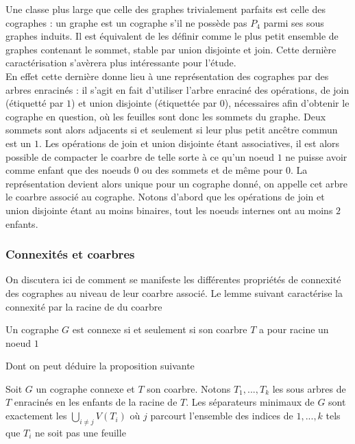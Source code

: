 \documentclass{scrartcl}
\begin{document}
\begin{flushleft}
Une classe plus large que celle des graphes trivialement parfaits est celle des cographes : un graphe est un cographe s'il ne possède pas
$P_4$ parmi ses sous graphes induits. Il est équivalent de les définir comme le plus petit ensemble de graphes contenant le sommet, stable par
union disjointe et join. Cette dernière caractérisation s'avèrera plus intéressante pour l'étude.\\
En effet cette dernière donne lieu à une représentation des cographes par des arbres enracinés : il s'agit en fait d'utiliser l'arbre
enraciné des opérations, de join (étiquetté par $1$) et union disjointe (étiquettée par $0$), nécessaires afin d'obtenir le cographe en question,
où les feuilles sont donc les sommets du graphe. Deux sommets sont alors adjacents si et seulement si leur plus petit ancêtre commun est un $1$.
Les opérations de join et union disjointe étant associatives, il est alors possible de compacter le coarbre de telle sorte à ce qu'un noeud
$1$ ne puisse avoir comme enfant que des noeuds $0$ ou des sommets et de même pour $0$. La représentation devient alors unique pour un cographe
donné, on appelle cet arbre le coarbre associé au cographe. Notons d'abord que les opérations de join et union disjointe étant au moins binaires,
tout les noeuds internes ont au moins $2$ enfants. 

\subsubsection{Connexités et coarbres}

On discutera ici de comment se manifeste les différentes propriétés de connexité des cographes au niveau de leur coarbre associé. Le lemme
suivant caractérise la connexité par la racine de du coarbre

\begin{lem}
    Un cographe $G$ est connexe si et seulement si son coarbre $T$ a pour racine un noeud $1$
\end{lem}

Dont on peut déduire la proposition suivante

\begin{prop}\label{sepcographe}
    Soit $G$ un cographe connexe et $T$ son coarbre. Notons $T_1, ..., T_k$ les sous arbres de $T$ enracinés en les enfants de la racine de $T$.
    Les séparateurs minimaux de $G$ sont exactement les $\displaystyle \bigcup_{i \neq j} V(T_i)$ où $j$ parcourt l'ensemble des indices de $1, ..., k$
    tels que $T_i$ ne soit pas une feuille
\end{prop}


\end{flushleft}
\end{document}
